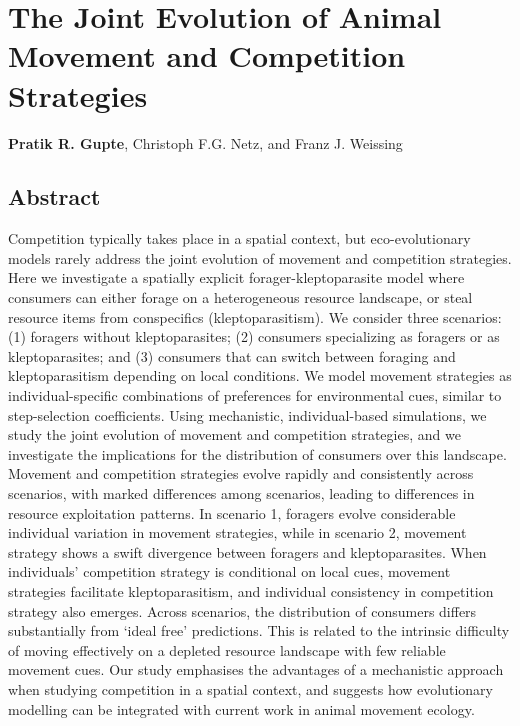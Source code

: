 \chapter{The Joint Evolution of Animal Movement and Competition Strategies}\label{ch:kleptomove}

{\noindent \sffamily\textbf{Pratik R. Gupte}, Christoph F.G. Netz, and Franz J. Weissing}

\section*{Abstract}

{
    \small
    Competition typically takes place in a spatial context, but eco-evolutionary models rarely address the joint evolution of movement and competition strategies.
    Here we investigate a spatially explicit forager-kleptoparasite model where consumers can either forage on a heterogeneous resource landscape, or steal resource items from conspecifics (kleptoparasitism). We consider three scenarios: (1) foragers without kleptoparasites; (2) consumers specializing as foragers or as kleptoparasites; and (3) consumers that can switch between foraging and kleptoparasitism depending on local conditions.
    We model movement strategies as individual-specific combinations of preferences for environmental cues, similar to step-selection coefficients.
    Using mechanistic, individual-based simulations, we study the joint evolution of movement and competition strategies, and we investigate the implications for the distribution of consumers over this landscape.
    Movement and competition strategies evolve rapidly and consistently across scenarios, with marked differences among scenarios, leading to differences in resource exploitation patterns.
    In scenario 1, foragers evolve considerable individual variation in movement strategies, while in scenario 2, movement strategy shows a swift divergence between foragers and kleptoparasites.
    When individuals' competition strategy is conditional on local cues, movement strategies facilitate kleptoparasitism, and individual consistency in competition strategy also emerges.
    Across scenarios, the distribution of consumers differs substantially from `ideal free' predictions.
    This is related to the intrinsic difficulty of moving effectively on a depleted resource landscape with few reliable movement cues.
    Our study emphasises the advantages of a mechanistic approach when studying competition in a spatial context, and suggests how evolutionary modelling can be integrated with current work in animal movement ecology.
}

